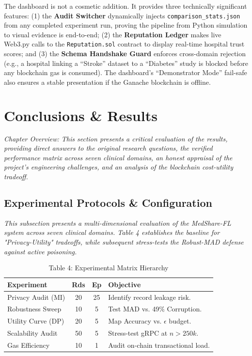 \documentclass[10pt, a4paper, twocolumn]{article}
\begin{document}
The dashboard is not a cosmetic addition. It provides three technically significant features: (1) the \textbf{Audit Switcher} dynamically injects \texttt{comparison\_stats.json} from any completed experiment run, proving the pipeline from Python simulation to visual evidence is end-to-end; (2) the \textbf{Reputation Ledger} makes live Web3.py calls to the \texttt{Reputation.sol} contract to display real-time hospital trust scores; and (3) the \textbf{Schema Handshake Guard} enforces cross-domain rejection (e.g., a hospital linking a ``Stroke'' dataset to a ``Diabetes'' study is blocked before any blockchain gas is consumed). The dashboard's ``Demonstrator Mode'' fail-safe also ensures a stable presentation if the Ganache blockchain is offline.

\section{Conclusions \& Results}
\label{sec:conclusions}

\textit{Chapter Overview: This section presents a critical evaluation of the results, providing direct answers to the original research questions, the verified performance matrix across seven clinical domains, an honest appraisal of the project's engineering challenges, and an analysis of the blockchain cost-utility tradeoff.}

\subsection{Experimental Protocols \& Configuration}

\textit{This subsection presents a multi-dimensional evaluation of the MedShare-FL system across seven clinical domains. Table 4 establishes the baseline for "Privacy-Utility" tradeoffs, while subsequent stress-tests the Robust-MAD defense against active poisoning.}

\begin{table}[hbt!]
\centering
\scriptsize
\begin{tabular}{lccl}
\toprule
\textbf{Experiment} & \textbf{Rds} & \textbf{Ep} & \textbf{Objective} \\
\midrule
Privacy Audit (MI) & 20 & 25 & Identify record leakage risk. \\
Robustness Sweep & 10 & 5 & Test MAD vs. 49\% Corruption. \\
Utility Curve (DP) & 20 & 5 & Map Accuracy vs. $\epsilon$ budget. \\
Scalability Audit & 50 & 5 & Stress-test gRPC at $n > 250k$. \\
Gas Efficiency & 10 & 1 & Audit on-chain transactional load. \\
\bottomrule
\end{tabular}
\caption{Table 4: Experimental Matrix Hierarchy}
\end{table}
\end{document}
